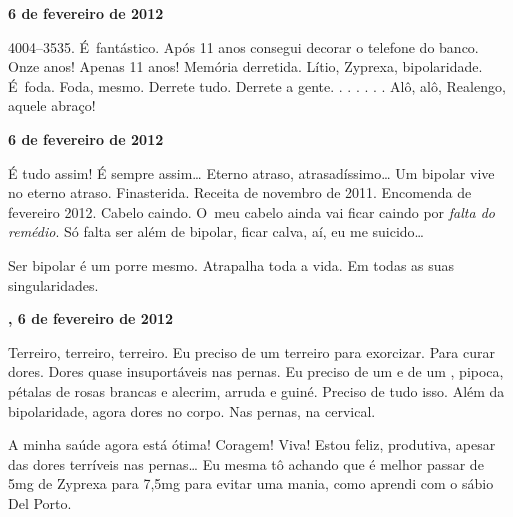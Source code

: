\begin{center}\asterisc{}\end{center}


\begin{flushright}\textbf{ 6 de fevereiro de 2012}\end{flushright}


4004--3535. É~fantástico. Após 11 anos consegui decorar o telefone do
banco. Onze anos! Apenas 11 anos! Memória derretida. Lítio, Zyprexa,
bipolaridade. É~foda. Foda, mesmo. Derrete tudo. Derrete a gente.
. . . \emph{ }. .
\emph{}. Alô, alô, Realengo, aquele abraço!

\begin{center}\asterisc{}\end{center}

\begin{flushright}\textbf{ 6 de fevereiro de 2012}\end{flushright}


É tudo assim! É sempre assim… Eterno atraso,
atrasadíssimo… Um bipolar vive no eterno atraso. Finasterida.
Receita de novembro de 2011. Encomenda de fevereiro 2012. Cabelo caindo.
O~meu cabelo ainda vai ficar caindo por \emph{falta do remédio}. Só
falta ser além de bipolar, ficar calva, aí, eu me suicido…

Ser bipolar é um porre mesmo. Atrapalha toda a vida. Em todas as suas
singularidades.

\begin{center}\asterisc{}\end{center}

\begin{flushright}\textbf{, 6 de fevereiro de 2012}\end{flushright}


Terreiro, terreiro, terreiro. Eu preciso de um terreiro para exorcizar.
Para curar dores. Dores quase insuportáveis nas pernas. Eu preciso de um
 e de um , pipoca, pétalas de rosas brancas e alecrim, arruda e
guiné. Preciso de tudo isso. Além da bipolaridade, agora dores no corpo.
Nas pernas, na cervical.

\begin{center}\asterisc{}\end{center}


A minha saúde agora está ótima! Coragem! Viva! Estou feliz, produtiva,
apesar das dores terríveis nas pernas… Eu mesma tô achando que é
melhor passar de 5mg de Zyprexa para 7,5mg para evitar uma mania, como
aprendi com o sábio Del Porto.


